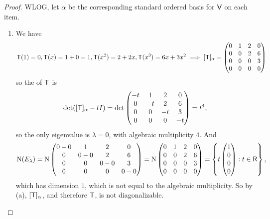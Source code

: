 \begin{proof}
WLOG, let \(\alpha\) be the corresponding standard ordered basis for \(\textsf{V}\) on each item.
\begin{enumerate}
\item We have
\begin{align*}
    \textsf{T}(1) = 0, \textsf{T}(x) = 1 + 0 = 1, \textsf{T}(x^2) = 2 + 2x, \textsf{T}(x^3) = 6x + 3x^2
    \implies [\textsf{T}]_{\alpha}
    = \begin{pmatrix}
        0 & 1 & 2 & 0 \\
        0 & 0 & 2 & 6 \\
        0 & 0 & 0 & 3 \\
        0 & 0 & 0 & 0
    \end{pmatrix}
\end{align*}
so the \CPOLY{} of \(\textsf{T}\) is
\[
    \det([\textsf{T}]_{\alpha} - tI) = \det \begin{pmatrix}
        -t & 1 & 2 & 0 \\
        0 & -t & 2 & 6 \\
        0 & 0 & -t & 3 \\
        0 & 0 & 0 & -t
    \end{pmatrix} = t^4,
\]
so the only eigenvalue is \(\lambda = 0\), with algebraic multiplicity \(4\).
And
\[
    \mathrm{N}(E_{\lambda}) = \mathrm{N} \begin{pmatrix}
        0-0 & 1 & 2 & 0 \\
        0 & 0-0 & 2 & 6 \\
        0 & 0 & 0-0 & 3 \\
        0 & 0 & 0 & 0-0
    \end{pmatrix}
    = \mathrm{N} \begin{pmatrix}
        0 & 1 & 2 & 0 \\
        0 & 0 & 2 & 6 \\
        0 & 0 & 0 & 3 \\
        0 & 0 & 0 & 0
    \end{pmatrix}
    = \left\{ t \begin{pmatrix} 1 \\ 0 \\ 0 \\ 0 \end{pmatrix} : t \in \textsf{R} \right\},
\]
which has dimension \(1\), which is not equal to the algebraic multiplicity.
So by (a), \([\textsf{T}]_{\alpha}\), and therefore \(\textsf{T}\), is not diagonalizable.


\end{enumerate}
\end{proof}

